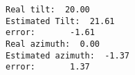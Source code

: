 \documentclass[11pt]{article}
\makeatletter
\newcommand{\boxspacing}{\kern\kvtcb@left@rule\kern\kvtcb@boxsep}
\newcommand{\prompt}[4]{
        {\ttfamily\llap{{\color{#2}[#3]:\hspace{3pt}#4}}\vspace{-\baselineskip}}
    }
\makeatother
\begin{document}
    \begin{Verbatim}[commandchars=\\\{\}]
Real tilt:  20.00
Estimated Tilt:  21.61
error:       -1.61
Real azimuth:  0.00
Estimated azimuth:  -1.37
error:       1.37
    \end{Verbatim}

    \begin{tcolorbox}[breakable, size=fbox, boxrule=1pt, pad at break*=1mm,colback=cellbackground, colframe=cellborder]
\prompt{In}{incolor}{ }{\boxspacing}
\begin{Verbatim}[commandchars=\\\{\}]

\end{Verbatim}
\end{tcolorbox}


    
    
    
\end{document}
